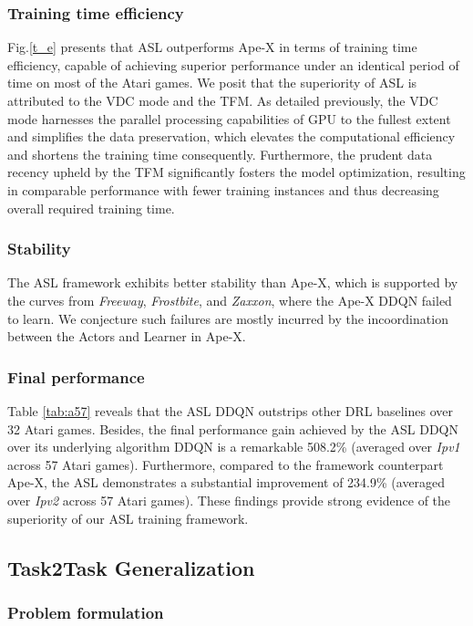 \documentclass[journal]{IEEEtran}
\begin{document}
\subsubsection{Training time efficiency}
Fig.\ref{t_e} presents that ASL outperforms Ape-X in terms of training time efficiency, capable of achieving superior performance under an identical period of time on most of the Atari games. We posit that the superiority of ASL is attributed to the VDC mode and the TFM. As detailed previously, the VDC mode harnesses the parallel processing capabilities of GPU to the fullest extent and simplifies the data preservation, which elevates the computational efficiency and shortens the training time consequently. Furthermore, the prudent data recency upheld by the TFM significantly fosters the model optimization, resulting in comparable performance with fewer training instances and thus decreasing overall required training time.

\subsubsection{Stability}
The ASL framework exhibits better stability than Ape-X, which is supported by the curves from \textit{Freeway}, \textit{Frostbite}, and \textit{Zaxxon}, where the Ape-X DDQN failed to learn. We conjecture such failures are mostly incurred by the incoordination between the Actors and Learner in Ape-X.

\subsubsection{Final performance}
Table \ref{tab:a57} reveals that the ASL DDQN outstrips other DRL baselines over 32 Atari games. Besides, the final performance gain achieved by the ASL DDQN over its underlying algorithm DDQN is a remarkable 508.2\% (averaged over \textit{Ipv1} across 57 Atari games). Furthermore, compared to the framework counterpart Ape-X, the ASL demonstrates a substantial improvement of 234.9\% (averaged over \textit{Ipv2} across 57 Atari games). These findings provide strong evidence of the superiority of our ASL training framework.


\subsection{Task2Task Generalization}
\subsubsection{Problem formulation}
\end{document}
